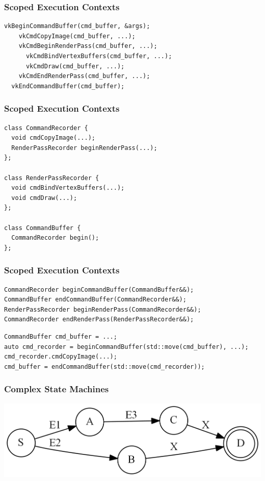 \documentclass[aspectratio=169]{beamer}
\begin{document}
\begin{frame}[fragile]
  \frametitle{Scoped Execution Contexts}
  
  \begin{lstlisting}[style=cpp20]
  vkBeginCommandBuffer(cmd_buffer, &args);
    vkCmdCopyImage(cmd_buffer, ...);
    vkCmdBeginRenderPass(cmd_buffer, ...);
      vkCmdBindVertexBuffers(cmd_buffer, ...);
      vkCmdDraw(cmd_buffer, ...);
    vkCmdEndRenderPass(cmd_buffer, ...);
  vkEndCommandBuffer(cmd_buffer);
  \end{lstlisting}
  
\end{frame}

\begin{frame}[fragile]
  \frametitle{Scoped Execution Contexts}
  
  \begin{lstlisting}[style=cpp20]
class CommandRecorder {
  void cmdCopyImage(...);
  RenderPassRecorder beginRenderPass(...);
};

class RenderPassRecorder {
  void cmdBindVertexBuffers(...);
  void cmdDraw(...);
};

class CommandBuffer {
  CommandRecorder begin();
};
  \end{lstlisting}
\end{frame}

\begin{frame}[fragile]
  \frametitle{Scoped Execution Contexts}
  
  \begin{lstlisting}[style=cpp20]
CommandRecorder beginCommandBuffer(CommandBuffer&&);
CommandBuffer endCommandBuffer(CommandRecorder&&);
RenderPassRecorder beginRenderPass(CommandRecorder&&);
CommandRecorder endRenderPass(RenderPassRecorder&&);
  \end{lstlisting}
  
  \begin{lstlisting}[style=cpp20]
CommandBuffer cmd_buffer = ...;
auto cmd_recorder = beginCommandBuffer(std::move(cmd_buffer), ...);
cmd_recorder.cmdCopyImage(...);
cmd_buffer = endCommandBuffer(std::move(cmd_recorder));
  \end{lstlisting}
\end{frame}


\begin{frame}[fragile]
  \frametitle{Complex State Machines}
  
  \begin{center}
  \includegraphics[width=.9\textwidth]{ifgfx/state_machine.png}
  \end{center}
\end{frame}
\end{document}
